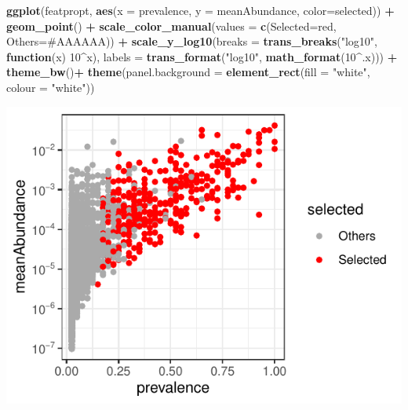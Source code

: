 \documentclass[
]{article}
\newenvironment{Shaded}{\begin{snugshade}}{\end{snugshade}}
\newcommand{\AttributeTok}[1]{\textcolor[rgb]{0.13,0.29,0.53}{#1}}
\newcommand{\ControlFlowTok}[1]{\textcolor[rgb]{0.13,0.29,0.53}{\textbf{#1}}}
\newcommand{\DecValTok}[1]{\textcolor[rgb]{0.00,0.00,0.81}{#1}}
\newcommand{\FunctionTok}[1]{\textcolor[rgb]{0.13,0.29,0.53}{\textbf{#1}}}
\newcommand{\NormalTok}[1]{#1}
\newcommand{\OtherTok}[1]{\textcolor[rgb]{0.56,0.35,0.01}{#1}}
\newcommand{\SpecialCharTok}[1]{\textcolor[rgb]{0.81,0.36,0.00}{\textbf{#1}}}
\newcommand{\StringTok}[1]{\textcolor[rgb]{0.31,0.60,0.02}{#1}}
\begin{document}
\begin{Shaded}
\begin{Highlighting}[]
\FunctionTok{ggplot}\NormalTok{(featpropt, }\FunctionTok{aes}\NormalTok{(}\AttributeTok{x =}\NormalTok{ prevalence, }\AttributeTok{y =}\NormalTok{ meanAbundance, }\AttributeTok{color=}\NormalTok{selected)) }\SpecialCharTok{+} \FunctionTok{geom\_point}\NormalTok{() }\SpecialCharTok{+}
  \FunctionTok{scale\_color\_manual}\NormalTok{(}\AttributeTok{values =} \FunctionTok{c}\NormalTok{(}\StringTok{\textquotesingle{}Selected\textquotesingle{}}\OtherTok{=}\StringTok{\textquotesingle{}red\textquotesingle{}}\NormalTok{, }\StringTok{\textquotesingle{}Others\textquotesingle{}}\OtherTok{=}\StringTok{\textquotesingle{}\#AAAAAA\textquotesingle{}}\NormalTok{)) }\SpecialCharTok{+} 
  \FunctionTok{scale\_y\_log10}\NormalTok{(}\AttributeTok{breaks =} \FunctionTok{trans\_breaks}\NormalTok{(}\StringTok{"log10"}\NormalTok{, }\ControlFlowTok{function}\NormalTok{(x) }\DecValTok{10}\SpecialCharTok{\^{}}\NormalTok{x),}
                \AttributeTok{labels =} \FunctionTok{trans\_format}\NormalTok{(}\StringTok{"log10"}\NormalTok{, }\FunctionTok{math\_format}\NormalTok{(}\DecValTok{10}\SpecialCharTok{\^{}}\NormalTok{.x))) }\SpecialCharTok{+}
  \FunctionTok{theme\_bw}\NormalTok{()}\SpecialCharTok{+} \FunctionTok{theme}\NormalTok{(}\AttributeTok{panel.background =} \FunctionTok{element\_rect}\NormalTok{(}\AttributeTok{fill =} \StringTok{"white"}\NormalTok{, }\AttributeTok{colour =} \StringTok{"white"}\NormalTok{))}
\end{Highlighting}
\end{Shaded}

\includegraphics{workshop_files/figure-latex/unnamed-chunk-48-1.pdf}
\end{document}
